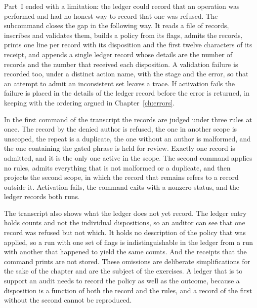 Part~I ended with a limitation: the ledger could record that an operation was performed and had no honest way to record that one was refused. The  subcommand closes the gap in the following way. It reads a file of records, inscribes and validates them, builds a policy from its flags, admits the records, prints one line per record with its disposition and the first twelve characters of its receipt, and appends a single ledger record whose details are the number of records and the number that received each disposition. A validation failure is recorded too, under a distinct action name, with the stage and the error, so that an attempt to admit an inconsistent set leaves a trace. If activation fails the failure is placed in the details of the ledger record before the error is returned, in keeping with the ordering argued in Chapter~\ref{ch:errors}.



In the first command of the transcript the records are judged under three rules at once. The record by the denied author is refused, the one in another scope is unscoped, the repeat is a duplicate, the one without an author is malformed, and the one containing the gated phrase is held for review. Exactly one record is admitted, and it is the only one active in the scope. The second command applies no rules, admits everything that is not malformed or a duplicate, and then projects the second scope, in which the record that remains refers to a record outside it. Activation fails, the command exits with a nonzero status, and the ledger records both runs.

The transcript also shows what the ledger does not yet record. The ledger entry holds counts and not the individual dispositions, so an auditor can see that one record was refused but not which. It holds no description of the policy that was applied, so a run with one set of flags is indistinguishable in the ledger from a run with another that happened to yield the same counts. And the receipts that the command prints are not stored. These omissions are deliberate simplifications for the sake of the chapter and are the subject of the exercises. A ledger that is to support an audit needs to record the policy as well as the outcome, because a disposition is a function of both the record and the rules, and a record of the first without the second cannot be reproduced.

